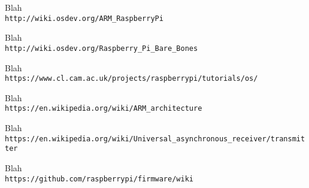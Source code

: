 \begin{thebibliography}{6}

\bibitem{} 
Blah
\\\texttt{http://wiki.osdev.org/ARM\_RaspberryPi}

\bibitem{} 
Blah
\\\texttt{http://wiki.osdev.org/Raspberry\_Pi\_Bare\_Bones}

\bibitem{} 
Blah
\\\texttt{https://www.cl.cam.ac.uk/projects/raspberrypi/tutorials/os/}

\bibitem{} 
Blah
\\\texttt{https://en.wikipedia.org/wiki/ARM\_architecture}

\bibitem{} 
Blah
\\\texttt{https://en.wikipedia.org/wiki/Universal\_asynchronous\_receiver/transmitter}

\bibitem{} 
Blah
\\\texttt{https://github.com/raspberrypi/firmware/wiki}

\end{thebibliography}
